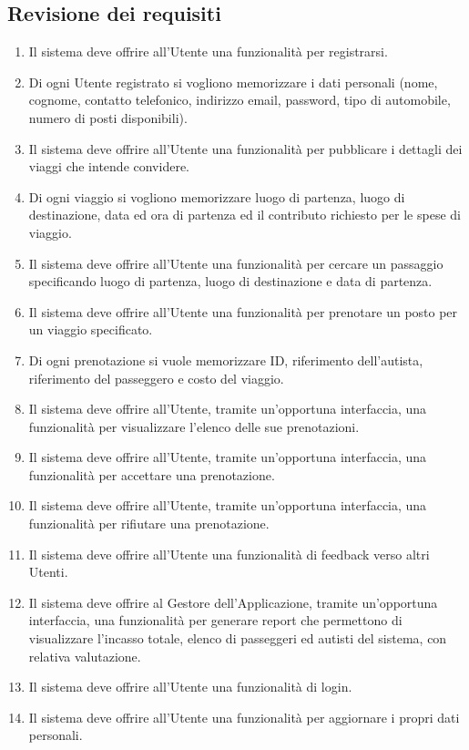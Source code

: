 \subsection{Revisione dei requisiti}

\begin{enumerate}
    \item {Il sistema deve offrire all'Utente una funzionalità per registrarsi.}
    \item {Di ogni Utente registrato si vogliono memorizzare i dati personali (nome, cognome, contatto telefonico, indirizzo email, password, tipo di automobile, numero di posti disponibili).}
    \item {Il sistema deve offrire all'Utente una funzionalità per pubblicare i dettagli dei viaggi che intende convidere.}
    \item {Di ogni viaggio si vogliono memorizzare luogo di partenza, luogo di destinazione, data ed ora di partenza ed il contributo richiesto per le spese di viaggio.}
    \item {Il sistema deve offrire all'Utente una funzionalità per cercare un passaggio specificando luogo di partenza, luogo di destinazione e data di partenza.}
    \item {Il sistema deve offrire all'Utente una funzionalità per prenotare un posto per un viaggio specificato.}
    \item {Di ogni prenotazione si vuole memorizzare ID, riferimento dell'autista, riferimento del passeggero e costo del viaggio.}
    \item {Il sistema deve offrire all'Utente, tramite un'opportuna interfaccia, una funzionalità per visualizzare l'elenco delle sue prenotazioni.}
    \item {Il sistema deve offrire all'Utente, tramite un'opportuna interfaccia, una funzionalità per accettare una prenotazione.}
    \item {Il sistema deve offrire all'Utente, tramite un'opportuna interfaccia, una funzionalità per rifiutare una prenotazione.}
    \item {Il sistema deve offrire all'Utente una funzionalità di feedback verso altri Utenti.}
    \item {Il sistema deve offrire al Gestore dell'Applicazione, tramite un'opportuna interfaccia, una funzionalità per generare report che permettono di visualizzare l'incasso totale, elenco di passeggeri ed autisti del sistema, con relativa valutazione.}
    \item {Il sistema deve offrire all'Utente una funzionalità di login. }
    \item {Il sistema deve offrire all'Utente una funzionalità per aggiornare i propri dati personali.}
\end{enumerate}